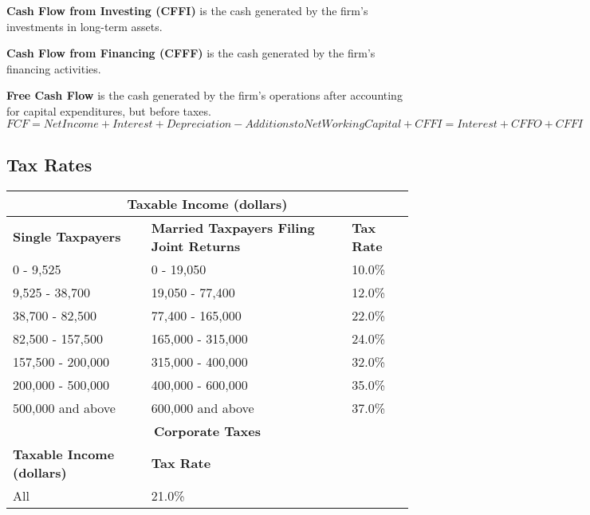 \textbf{Cash Flow from Investing (CFFI)} is the cash generated by the firm's investments in long-term assets.

\textbf{Cash Flow from Financing (CFFF)} is the cash generated by the firm's financing activities.

\textbf{Free Cash Flow} is the cash generated by the firm's operations after accounting for capital expenditures, but before taxes.
$FCF = Net Income + Interest + Depreciation - Additions to Net Working Capital + CFFI = Interest + CFFO + CFFI$

\subsection{Tax Rates}

\begin{tabularx}{\linewidth}{X X X}
\toprule
\multicolumn{3}{c}{\textbf{Taxable Income (dollars)}} \\
\midrule
\textbf{Single Taxpayers} & \textbf{Married Taxpayers Filing Joint Returns} & \textbf{Tax Rate} \\
\midrule
0 - 9,525 & 0 - 19,050 & 10.0\% \\
9,525 - 38,700 & 19,050 - 77,400 & 12.0\% \\
38,700 - 82,500 & 77,400 - 165,000 & 22.0\% \\
82,500 - 157,500 & 165,000 - 315,000 & 24.0\% \\
157,500 - 200,000 & 315,000 - 400,000 & 32.0\% \\
200,000 - 500,000 & 400,000 - 600,000 & 35.0\% \\
500,000 and above & 600,000 and above & 37.0\% \\
\toprule
\multicolumn{3}{c}{\textbf{Corporate Taxes}} \\
\midrule
\textbf{Taxable Income (dollars)} & \textbf{Tax Rate} \\
\midrule
All & 21.0\% \\
\bottomrule
\end{tabularx}
